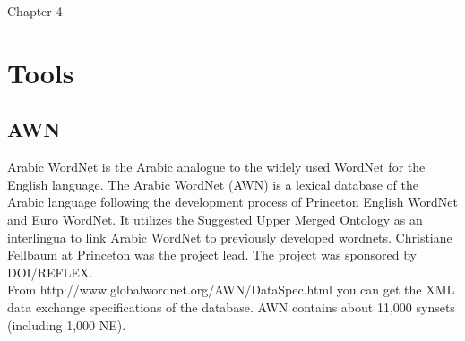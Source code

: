 Chapter 4

\chapter{Tools} %

\label{Chapter4} %



\section{AWN}
Arabic WordNet is the Arabic analogue to the widely used WordNet for the English language. The Arabic WordNet (AWN) is a lexical database of the Arabic language following the development process of Princeton English WordNet and Euro WordNet. It utilizes the Suggested Upper Merged Ontology as an interlingua to link Arabic WordNet to previously developed wordnets. Christiane Fellbaum at Princeton was the project lead. The project was sponsored by DOI/REFLEX.\\
From http://www.globalwordnet.org/AWN/DataSpec.html you can get the XML data exchange specifications of the database. AWN contains about 11,000 synsets (including 1,000 NE).\\

